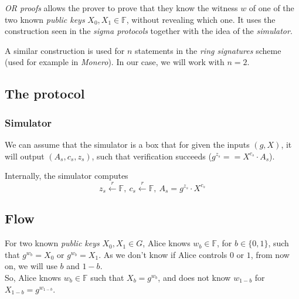 \documentclass{article}
\theoremstyle{definition}
\begin{document}
\emph{OR proofs} allows the prover to prove that they know the witness $w$ of one of the two known \emph{public keys} $X_0, X_1 \in \mathbb{F}$, without revealing which one. It uses the construction seen in the \emph{sigma protocols} together with the idea of the \emph{simulator}.

A similar construction is used for $n$ statements in the \emph{ring signatures} scheme (used for example in \emph{Monero}). In our case, we will work with $n=2$.

\subsection{The protocol}
\subsubsection{Simulator}
We can assume that the simulator is a box that for given the inputs $(g, X)$, it will output $(A_s, c_s, z_s)$, such that verification succeeds ($g^{z_s}==X^{c_s} \cdot A_s$).

\begin{center}
\end{center}

Internally, the simulator computes
$$z_s \xleftarrow{r} \mathbb{F},~c_s \xleftarrow{r} \mathbb{F},~A_s = g^{z_s} \cdot X^{c_s}$$

\subsection{Flow}
For two known \emph{public keys} $X_0, X_1 \in G$, Alice knows $w_b \in \mathbb{F}$, for $b \in \{0, 1\}$, such that $g^{w_b} = X_0$ or $g^{w_b} = X_1$. As we don't know if Alice controls $0$ or $1$, from now on, we will use $b$ and $1-b$.
\\
So, Alice knows $w_b \in \mathbb{F}$ such that $X_b = g^{w_b}$, and does not know $w_{1-b}$ for $X_{1-b}=g^{w_{1-b}}$.
\end{document}
